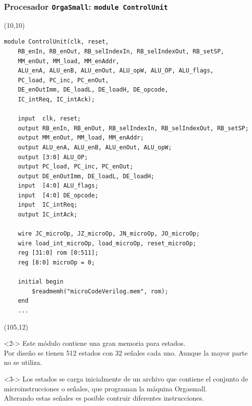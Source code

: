 \documentclass[aspectratio=169]{beamer}
\begin{document}
\begin{frame}[fragile,t]
    \frametitle{Procesador \texttt{OrgaSmall}: \texttt{module ControlUnit}}
    \begin{textblock}{90}(10,10)
\lstset{basicstyle=\tiny}
\begin{lstlisting}
module ControlUnit(clk, reset,
    RB_enIn, RB_enOut, RB_selIndexIn, RB_selIndexOut, RB_setSP,
    MM_enOut, MM_load, MM_enAddr,
    ALU_enA, ALU_enB, ALU_enOut, ALU_opW, ALU_OP, ALU_flags,
    PC_load, PC_inc, PC_enOut,
    DE_enOutImm, DE_loadL, DE_loadH, DE_opcode,
    IC_intReq, IC_intAck);

    input  clk, reset;
    output RB_enIn, RB_enOut, RB_selIndexIn, RB_selIndexOut, RB_setSP;
    output MM_enOut, MM_load, MM_enAddr;
    output ALU_enA, ALU_enB, ALU_enOut, ALU_opW;
    output [3:0] ALU_OP;
    output PC_load, PC_inc, PC_enOut;
    output DE_enOutImm, DE_loadL, DE_loadH;
    input  [4:0] ALU_flags;
    input  [4:0] DE_opcode;
    input  IC_intReq;
    output IC_intAck;
    
    wire JC_microOp, JZ_microOp, JN_microOp, JO_microOp;
    wire load_int_microOp, load_microOp, reset_microOp;
    reg [31:0] rom [0:511];
    reg [8:0] microOp = 0;

    initial begin
        $readmemh("microCodeVerilog.mem", rom); 
    end
    ...
\end{lstlisting}
    \end{textblock}
    \begin{textblock}{45}(105,12)
    \small
    \begin{onlyenv}<2->
    Este módulo contiene una gran memoria para estados.\\
    \bigskip
    \textcolor{verdeuca}{Por diseño se tienen 512 estados con 32 señales cada uno.
    Aunque la mayor parte no se utiliza.}\\
    \end{onlyenv}
    \bigskip
    \begin{onlyenv}<3->
    Los estados se carga inicialmente de un archivo que contiene el conjunto de microinstrucciones o señales, que programan la máquina Orgasmall.\\
    \bigskip
    \textcolor{verdeuca}{Alterando estas señales es posible contruir diferentes instrucciones.}
    \end{onlyenv}
    \end{textblock}
\end{frame}
\end{document}
